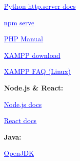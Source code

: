\documentclass[
  english,
  paper=a4,
  oneside  ,captions=tableheading
]{scrartcl}
\begin{document}
%
  \par\vspace{0.5ex}%
  \href{https://docs.python.org/3/library/http.server.html}{\textcolor{blue}{\underline{\faLink\quad Python http.server docs}}}%
  \par\vspace{0.5ex}%

%
  \par\vspace{0.5ex}%
  \href{https://www.npmjs.com/package/serve}{\textcolor{blue}{\underline{\faLink\quad npm serve}}}%
  \par\vspace{0.5ex}%

%
  \par\vspace{0.5ex}%
  \href{https://www.php.net/manual/en/}{\textcolor{blue}{\underline{\faLink\quad PHP Manual}}}%
  \par\vspace{0.5ex}%

%
  \par\vspace{0.5ex}%
  \href{https://www.apachefriends.org/index.html}{\textcolor{blue}{\underline{\faLink\quad XAMPP download}}}%
  \par\vspace{0.5ex}%

%
  \par\vspace{0.5ex}%
  \href{https://www.apachefriends.org/faq\_linux.html}{\textcolor{blue}{\underline{\faLink\quad XAMPP FAQ (Linux)}}}%
  \par\vspace{0.5ex}%

\textbf{Node.js \& React:}

%
  \par\vspace{0.5ex}%
  \href{https://nodejs.org/en/docs}{\textcolor{blue}{\underline{\faLink\quad Node.js docs}}}%
  \par\vspace{0.5ex}%

%
  \par\vspace{0.5ex}%
  \href{https://react.dev/learn}{\textcolor{blue}{\underline{\faLink\quad React docs}}}%
  \par\vspace{0.5ex}%

\textbf{Java:}

%
  \par\vspace{0.5ex}%
  \href{https://openjdk.org/}{\textcolor{blue}{\underline{\faLink\quad OpenJDK}}}%
  \par\vspace{0.5ex}%
\end{document}
